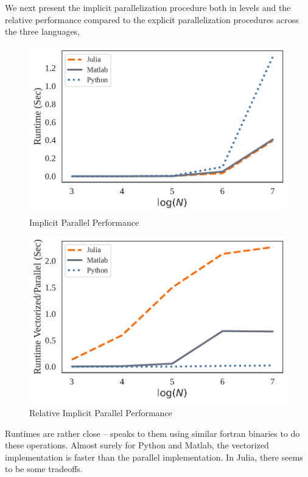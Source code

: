 \documentclass[a4paper, 12pt]{article}
\begin{document}
We next present the implicit parallelization procedure both in levels and the relative performance compared to the explicit parallelization procedures across the three languages, 


\begin{figure}[!ht]
    \centering
    \caption{Implicit Parallel Performance}
    \includegraphics[scale = 0.75]{../figs/vectorizedRT.pdf}
\end{figure}


\begin{figure}[!ht]
    \centering
    \caption{Relative Implicit Parallel Performance}
    \includegraphics[scale = 0.75]{../figs/vectorizedNormRT.pdf}
\end{figure}

Runtimes are rather close -- speaks to them using similar fortran binaries to do these operations. Almost surely for Python and Matlab, the vectorized implementation is faster than the parallel implementation. In Julia, there seems to be some tradeoffs. 
\end{document}
